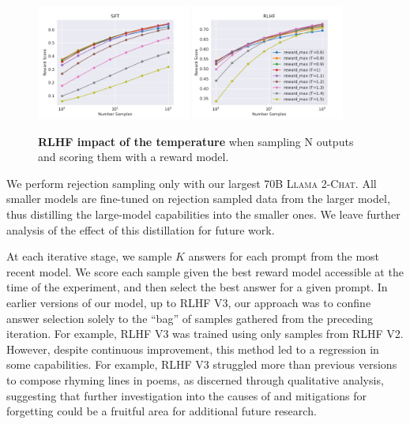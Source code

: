\documentclass{article}
\newcommand{\modelname}{\textsc{Llama 2-Chat}\xspace}
\begin{document}
\begin{figure}[htbp]
\centering
    \includegraphics[width=0.45\textwidth]{img/SFT_shift_distrib.temperature_shift.pdf}
    \includegraphics[width=0.45\textwidth]{img/RLHF_shift_distrib.temperature_shift.pdf}
    \caption{
    \textbf{RLHF impact of the temperature} when sampling N outputs and scoring them with a reward model.
    \label{fig:shift_distrib.temperature_shift}
    }
    \vspace{-0.4cm}
\end{figure}

We perform rejection sampling only with our largest 70B \modelname. All smaller models are fine-tuned on rejection sampled data from the larger model, thus distilling the large-model capabilities into the smaller ones. We leave further analysis of the effect of this distillation for future work.

At each iterative stage, we sample $K$ answers for each prompt from the most recent model. We score each sample given the best reward model accessible at the time of the experiment, and then select the best answer for a given prompt. In earlier versions of our model, up to RLHF V3, our approach was to confine answer selection solely to the ``bag'' of samples gathered from the preceding iteration. For example, RLHF V3 was trained using only samples from RLHF V2. However, despite continuous improvement, this method led to a regression in some capabilities. For example, RLHF V3 struggled more than previous versions to compose rhyming lines in poems, as discerned through qualitative analysis, suggesting that further investigation into the causes of and mitigations for forgetting \citep{kirkpatrick-etal-2017-overcoming, nguyen-etal-2019-toward,ramasesh-etal-2021-effect} could be a fruitful area for additional future research. 
\end{document}
